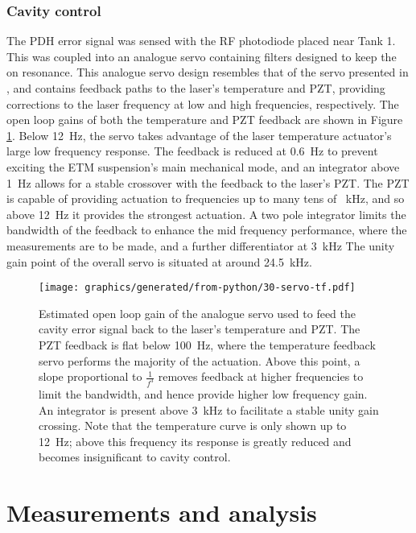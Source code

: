 \subsubsection{\label{sec:cavity-control}Cavity control}
The \gls{PDH} error signal was sensed with the RF photodiode placed near Tank 1. This was coupled into an analogue servo containing filters designed to keep the \FP{} on resonance. This analogue servo design resembles that of the servo presented in \cite{Macarthur2014}, and contains feedback paths to the laser's temperature and \gls{PZT}, providing corrections to the laser frequency at low and high frequencies, respectively. The open loop gains of both the temperature and \gls{PZT} feedback are shown in Figure\,\ref{fig:servo-tf}. Below \SI{12}{\hertz}, the servo takes advantage of the laser temperature actuator's large low frequency response. The feedback is reduced at \SI{0.6}{\hertz} to prevent exciting the \gls{ETM} suspension's main mechanical mode, and an integrator above \SI{1}{\hertz} allows for a stable crossover with the feedback to the laser's \gls{PZT}. The \gls{PZT} is capable of providing actuation to frequencies up to many tens of \SI{}{\kilo\hertz}, and so above \SI{12}{\hertz} it provides the strongest actuation. A two pole integrator limits the bandwidth of the feedback to enhance the mid frequency performance, where the measurements are to be made, and a further differentiator at \SI{3}{\kilo\hertz} The unity gain point of the overall servo is situated at around \SI{24.5}{\kilo\hertz}.

\begin{figure}
  \centering
  \texttt{[image: graphics/generated/from-python/30-servo-tf.pdf]}
  \caption{\label{fig:servo-tf}Estimated open loop gain of the analogue servo used to feed the cavity error signal back to the laser's temperature and PZT. The PZT feedback is flat below \SI{100}{\hertz}, where the temperature feedback servo performs the majority of the actuation. Above this point, a slope proportional to $\frac{1}{f^3}$ removes feedback at higher frequencies to limit the bandwidth, and hence provide higher low frequency gain. An integrator is present above \SI{3}{\kilo\hertz} to facilitate a stable unity gain crossing. Note that the temperature curve is only shown up to \SI{12}{\hertz}; above this frequency its response is greatly reduced and becomes insignificant to cavity control.}
\end{figure}

\section{Measurements and analysis}
\label{sec:measurements}

